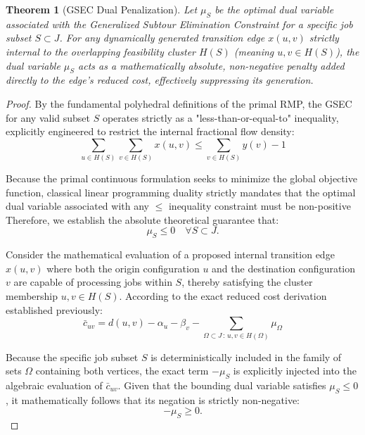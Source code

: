 \documentclass[11pt, a4paper]{book}
\newtheorem{theorem}{Theorem}[chapter]
\begin{document}
	\begin{theorem}[GSEC Dual Penalization]
		Let $\mu_S$ be the optimal dual variable associated with the Generalized Subtour Elimination Constraint for a specific job subset $S \subset J$. For any dynamically generated transition edge $x(u, v)$ strictly internal to the overlapping feasibility cluster $H(S)$ (meaning $u, v \in H(S)$), the dual variable $\mu_S$ acts as a mathematically absolute, non-negative penalty added directly to the edge's reduced cost, effectively suppressing its generation.
	\end{theorem}
	
	\begin{proof}
		By the fundamental polyhedral definitions of the primal RMP, the GSEC for any valid subset $S$ operates strictly as a "less-than-or-equal-to" inequality, explicitly engineered to restrict the internal fractional flow density:
		\begin{equation}
			\sum_{u \in H(S)} \sum_{v \in H(S)} x(u, v) \le \sum_{v \in H(S)} y(v) - 1
		\end{equation}
		
		Because the primal continuous formulation seeks to minimize the global objective function, classical linear programming duality strictly mandates that the optimal dual variable associated with any $\le$ inequality constraint must be non-positive %
		Therefore, we establish the absolute theoretical guarantee that:
		\begin{equation}
			\mu_S \le 0 \quad \forall S \subset J.
		\end{equation}
		
		Consider the mathematical evaluation of a proposed internal transition edge $x(u, v)$ where both the origin configuration $u$ and the destination configuration $v$ are capable of processing jobs within $S$, thereby satisfying the cluster membership $u, v \in H(S)$. According to the exact reduced cost derivation established previously:
		\begin{equation}
			\bar{c}_{uv} = d(u, v) - \alpha_u - \beta_v - \sum_{\Omega \subset J \,:\, u, v \in H(\Omega)} \mu_\Omega
		\end{equation}
		
		Because the specific job subset $S$ is deterministically included in the family of sets $\Omega$ containing both vertices, the exact term $-\mu_S$ is explicitly injected into the algebraic evaluation of $\bar{c}_{uv}$. Given that the bounding dual variable satisfies $\mu_S \le 0$, it mathematically follows that its negation is strictly non-negative:
		\begin{equation}
			-\mu_S \ge 0.
		\end{equation}
		

\end{proof}
\end{document}
